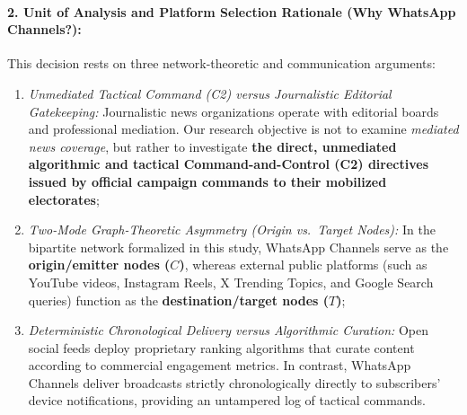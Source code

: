 \documentclass[preprint,12pt]{elsarticle}
\begin{document}
\paragraph{2. Unit of Analysis and Platform Selection Rationale (Why WhatsApp Channels?):}
This decision rests on three network-theoretic and communication arguments:
\begin{enumerate}
    \item \textit{Unmediated Tactical Command (C2) versus Journalistic Editorial Gatekeeping:} Journalistic news organizations operate with editorial boards and professional mediation. Our research objective is not to examine \textit{mediated news coverage}, but rather to investigate \textbf{the direct, unmediated algorithmic and tactical Command-and-Control (C2) directives issued by official campaign commands to their mobilized electorates};
    \item \textit{Two-Mode Graph-Theoretic Asymmetry (Origin vs.\ Target Nodes):} In the bipartite network formalized in this study, WhatsApp Channels serve as the \textbf{origin/emitter nodes ($C$)}, whereas external public platforms (such as YouTube videos, Instagram Reels, X Trending Topics, and Google Search queries) function as the \textbf{destination/target nodes ($T$)};
    \item \textit{Deterministic Chronological Delivery versus Algorithmic Curation:} Open social feeds deploy proprietary ranking algorithms that curate content according to commercial engagement metrics. In contrast, WhatsApp Channels deliver broadcasts strictly chronologically directly to subscribers' device notifications, providing an untampered log of tactical commands.
\end{enumerate}
\end{document}
